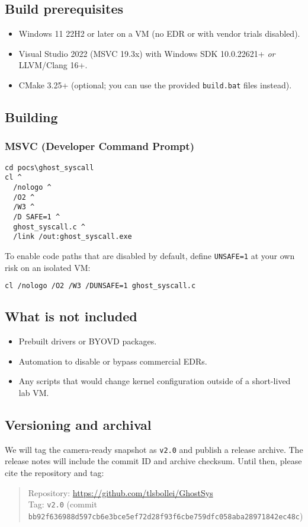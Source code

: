 \documentclass[11pt,letterpaper]{article}
\begin{document}
\subsection{Build prerequisites}
\begin{itemize}
  \item Windows 11 22H2 or later on a VM (no EDR or with vendor trials disabled).
  \item Visual Studio 2022 (MSVC 19.3x) with Windows SDK 10.0.22621+ \emph{or} LLVM/Clang 16+.
  \item CMake 3.25+ (optional; you can use the provided \texttt{build.bat} files instead).
\end{itemize}

\subsection{Building}
\vspace{3em} 

\subsubsection*{MSVC (Developer Command Prompt)}

\begin{lstlisting}[style=cmd]
cd pocs\ghost_syscall
cl ^
  /nologo ^
  /O2 ^
  /W3 ^
  /D SAFE=1 ^
  ghost_syscall.c ^
  /link /out:ghost_syscall.exe
\end{lstlisting}

\noindent
To enable code paths that are disabled by default, define \texttt{UNSAFE=1} at your own risk on an isolated VM:
\begin{lstlisting}[language=bash,basicstyle=\footnotesize\ttfamily]
cl /nologo /O2 /W3 /DUNSAFE=1 ghost_syscall.c
\end{lstlisting}

\subsection{What is not included}
\begin{itemize}
  \item Prebuilt drivers or BYOVD packages.
  \item Automation to disable or bypass commercial EDRs.
  \item Any scripts that would change kernel configuration outside of a short-lived lab VM.
\end{itemize}

\subsection{Versioning and archival}
We will tag the camera-ready snapshot as \texttt{v2.0} and publish a release archive. The release notes will include the commit ID and archive checksum. Until then, please cite the repository and tag:
\begin{quote}\footnotesize
Repository: \url{https://github.com/tlsbollei/GhostSys} \\
Tag: \texttt{v2.0} (commit \texttt{bb92f636988d597cb6e3bce5ef72d28f93f6cbe759dfc058aba28971842ec48c})
\end{quote}
\end{document}
